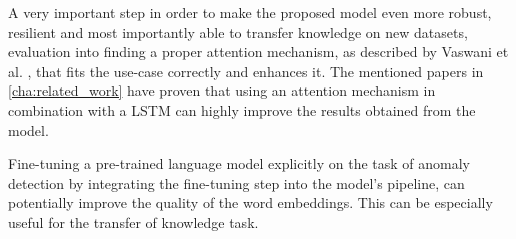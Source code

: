 A very important step in order to make the proposed model even more robust, resilient and most importantly able to transfer knowledge on new datasets, evaluation into finding a proper attention mechanism, as described by Vaswani et al. \cite{vaswani2017attention}, that fits the use-case correctly and enhances it. The mentioned papers in \ref{cha:related_work} have proven that using an attention mechanism in combination with a LSTM can highly improve the results obtained from the model.

Fine-tuning a pre-trained language model explicitly on the task of anomaly detection by integrating the fine-tuning step into the model's pipeline, can potentially improve the quality of the word embeddings. This can be especially useful for the transfer of knowledge task.



